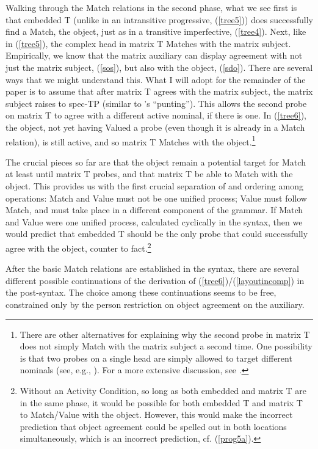 \documentclass[output=paper
,modfonts
,nonflat]{langsci/langscibook}
\begin{document}
\noindent Walking through the Match relations in the second phase, what we see first is that embedded T (unlike in an intransitive progressive, (\ref{tree5})) does successfully find a Match, the object, just as in a transitive imperfective, (\ref{tree4}). Next, like in (\ref{tree5}), the complex head in matrix T Matches with the matrix subject. Empirically, we know that the matrix auxiliary can display agreement with not just the matrix subject, (\ref{sos}), but also with the object, (\ref{sdo}). There are several ways that we might understand this. What I will adopt for the remainder of the paper is to assume that after matrix T agrees with the matrix subject, the matrix subject raises to spec-TP (similar to \citealt{AnandNevins06}'s ``punting''). This allows the second probe on matrix T to agree with a different active nominal, if there is one. In (\ref{tree6}), the object, not yet having Valued a probe (even though it is already in a Match relation), is still active, and so matrix T Matches with the object.\footnote{There are other alternatives for explaining why the second probe in matrix T does not simply Match with the matrix subject a second time. One possibility is that two probes on a single head are simply allowed to target different nominals (see, e.g., \citealt{Keine10}). For a more extensive discussion, see \citet[fn. 12]{Georgi12}.} 

The crucial pieces so far are that the object remain a potential target for Match at least until matrix T probes, and that matrix T be able to Match with the object. This provides us with the first crucial separation of and ordering among operations: Match and Value must not be one unified process; Value must follow Match, and must take place in a different component of the grammar. If Match and Value were one unified process, calculated cyclically in the syntax, then we would predict that embedded T should be the only probe that could successfully agree with the object, counter to fact.\footnote{Without an Activity Condition, so long as both embedded and matrix T are in the same phase, it would be possible for both embedded T and matrix T to Match/Value with the object. However, this would make the incorrect prediction that object agreement could be spelled out in both locations simultaneously, which is an incorrect prediction, cf. (\ref{prog5a}).}  

After the basic Match relations are established in the syntax, there are several different possible continuations of the derivation of (\ref{tree6})/(\ref{layoutincomp}) in the post-syntax. The choice among these continuations seems to be free, constrained only by the person restriction on object agreement on the auxiliary. 
\end{document}
